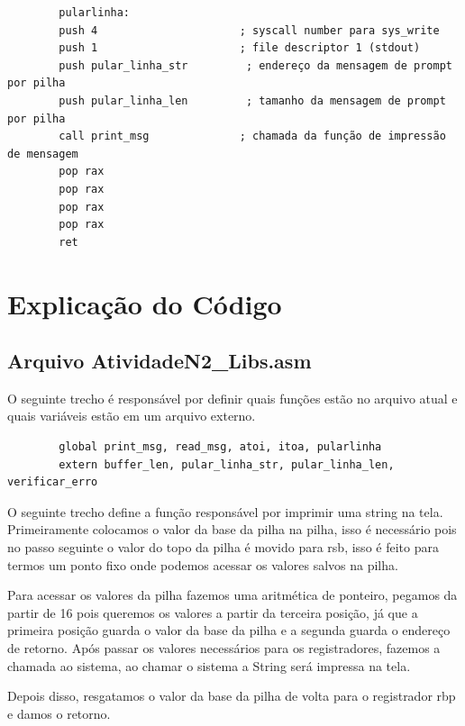 \documentclass[12pt, openany, oneside, a4paper, brazil]{abntex2}
\begin{document}
\begin{verbatim}
		pularlinha:
		push 4                      ; syscall number para sys_write
		push 1                      ; file descriptor 1 (stdout)
		push pular_linha_str         ; endereço da mensagem de prompt por pilha
		push pular_linha_len         ; tamanho da mensagem de prompt por pilha
		call print_msg              ; chamada da função de impressão de mensagem
		pop rax
		pop rax
		pop rax
		pop rax
		ret
	\end{verbatim}
	
	\section*{Explicação do Código}
	
	\subsection*{Arquivo AtividadeN2\_Libs.asm}
	
	O seguinte trecho é responsável por definir quais funções estão no arquivo atual e quais variáveis estão em um arquivo externo.
	\begin{verbatim}
		global print_msg, read_msg, atoi, itoa, pularlinha
		extern buffer_len, pular_linha_str, pular_linha_len, verificar_erro
	\end{verbatim}
	
	O seguinte trecho define a função responsável por imprimir uma string na tela. Primeiramente colocamos o valor da base da pilha na pilha, isso é necessário pois no passo seguinte o valor do topo da pilha é movido para rsb, isso é feito para termos um ponto fixo onde podemos acessar os valores salvos na pilha.
	
	\noindent Para acessar os valores da pilha fazemos uma aritmética de ponteiro, pegamos da partir de 16 pois queremos os valores a partir da terceira posição, já que a primeira posição guarda o valor da base da pilha e a segunda guarda o endereço de retorno.
	Após passar os valores necessários para os registradores, fazemos a chamada ao sistema, ao chamar o sistema a String será impressa na tela.
	
	\noindent Depois disso, resgatamos o valor da base da pilha de volta para o registrador rbp e damos o retorno.
	
\end{document}
